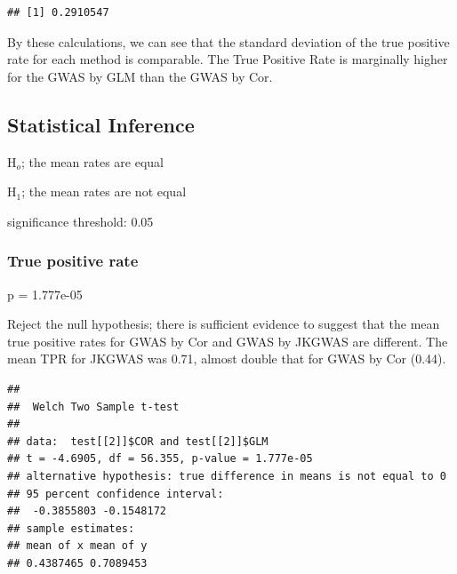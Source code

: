 \documentclass[
]{article}
\newenvironment{Shaded}{\begin{snugshade}}{\end{snugshade}}
\newcommand{\DataTypeTok}[1]{\textcolor[rgb]{0.13,0.29,0.53}{#1}}
\newcommand{\DecValTok}[1]{\textcolor[rgb]{0.00,0.00,0.81}{#1}}
\newcommand{\KeywordTok}[1]{\textcolor[rgb]{0.13,0.29,0.53}{\textbf{#1}}}
\newcommand{\NormalTok}[1]{#1}
\newcommand{\OperatorTok}[1]{\textcolor[rgb]{0.81,0.36,0.00}{\textbf{#1}}}
\begin{document}
\begin{verbatim}
## [1] 0.2910547
\end{verbatim}

By these calculations, we can see that the standard deviation of the
true positive rate for each method is comparable. The True Positive Rate
is marginally higher for the GWAS by GLM than the GWAS by Cor.

\hypertarget{statistical-inference}{%
\subsection{Statistical Inference}\label{statistical-inference}}

H\(_{o}\); the mean rates are equal

\par

H\(_{1}\); the mean rates are not equal

significance threshold: 0.05

\hypertarget{true-positive-rate-1}{%
\subsubsection{True positive rate}\label{true-positive-rate-1}}

p = 1.777e-05

Reject the null hypothesis; there is sufficient evidence to suggest that
the mean true positive rates for GWAS by Cor and GWAS by JKGWAS are
different. The mean TPR for JKGWAS was 0.71, almost double that for GWAS
by Cor (0.44).

\begin{Shaded}
\end{Shaded}

\begin{verbatim}
## 
##  Welch Two Sample t-test
## 
## data:  test[[2]]$COR and test[[2]]$GLM
## t = -4.6905, df = 56.355, p-value = 1.777e-05
## alternative hypothesis: true difference in means is not equal to 0
## 95 percent confidence interval:
##  -0.3855803 -0.1548172
## sample estimates:
## mean of x mean of y 
## 0.4387465 0.7089453
\end{verbatim}
\end{document}
